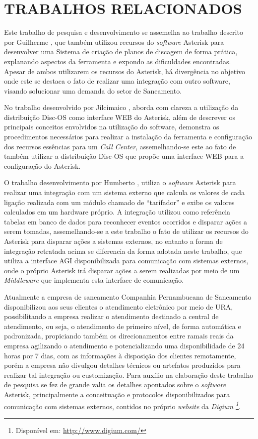 \section{TRABALHOS RELACIONADOS}
Este trabalho de pesquisa e desenvolvimento se assemelha ao trabalho descrito por Guilherme \cite{VIEIRA:2007}, que também utilizou recursos do \textit{software} Asterisk para desenvolver uma Sistema de criação de planos de discagem de forma prática, explanando aspectos da ferramenta e expondo as dificuldades encontradas. Apesar de ambos utilizarem os recursos do Asterisk, há divergência no objetivo onde este se destaca o fato de realizar uma integração com outro software, visando solucionar uma demanda do setor de Saneamento.

No trabalho desenvolvido por Jilcimaico \cite{DARU:2008}, aborda com clareza a utilização da distribuição Disc-OS como interface WEB do Asterisk, além de descrever os principais conceitos envolvidos na utilização do software, demonstra os procedimentos necessários para realizar a instalação da ferramenta e configuração dos recursos essências para um \textit{Call Center}, assemelhando-se este ao fato de também utilizar a distribuição Disc-OS que propõe uma interface WEB para a configuração do Asterisk.

O trabalho desenvolvimento por Humberto \cite{CAMPOS:2007}, utiliza o \textit{software} Asterisk para realizar uma integração com um sistema externo que calcula os valores de cada ligação realizada com um módulo chamado de “tarifador” e exibe os valores calculados em um hardware próprio. A integração utilizou como referência tabelas em banco de dados para reconhecer eventos ocorridos e disparar ações a serem tomadas, assemelhando-se a este trabalho o fato de utilizar os recursos do Asterisk para disparar ações a sistemas externos, no entanto a forma de integração retratada acima se diferencia da forma adotada neste trabalho, que utiliza a interface AGI disponibilizada para comunicação com sistemas externos, onde o próprio Asterisk irá disparar ações a serem realizadas por meio de um \textit{Middleware} que implementa esta interface de comunicação.

Atualmente a empresa de saneamento Companhia Pernambucana de Saneamento \cite{COMPESA:URA} disponibilizou aos seus clientes o atendimento eletrônico por meio de URA, possibilitando a empresa realizar o atendimento destinado a central de atendimento, ou seja, o atendimento de primeiro nível, de forma automática e padronizada, propiciando também os direcionamentos entre ramais reais da empresa agilizando o atendimento e potencializando uma disponibilidade de 24 horas por 7 dias, com as informações à disposição dos clientes remotamente, porém a empresa não divulgou detalhes técnicos ou artefatos produzidos para realizar tal integração ou customização.
Para auxílio na elaboração deste trabalho de pesquisa se fez de grande valia os detalhes apontados sobre o \textit{software} Asterisk, principalmente a conceituação e protocolos disponibilizados para comunicação com sistemas externos, contidos no próprio \textit{website} da \textit{Digium \footnote{Disponível em: \url{http://www.digium.com/}}}. 
